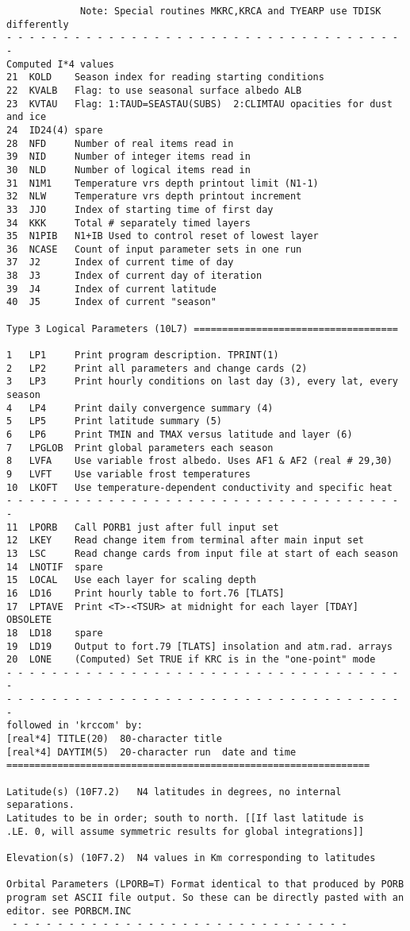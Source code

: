 \documentclass[draft]{article}  %
\begin{document}
\begin{verbatim}
             Note: Special routines MKRC,KRCA and TYEARP use TDISK differently
- - - - - - - - - - - - - - - - - - - - - - - - - - - - - - - - - - - - 
Computed I*4 values
21  KOLD    Season index for reading starting conditions
22  KVALB   Flag: to use seasonal surface albedo ALB
23  KVTAU   Flag: 1:TAUD=SEASTAU(SUBS)  2:CLIMTAU opacities for dust and ice
24  ID24(4) spare
28  NFD     Number of real items read in
39  NID     Number of integer items read in
30  NLD     Number of logical items read in
31  N1M1    Temperature vrs depth printout limit (N1-1)
32  NLW     Temperature vrs depth printout increment
33  JJO     Index of starting time of first day
34  KKK     Total # separately timed layers
35  N1PIB   N1+IB Used to control reset of lowest layer
36  NCASE   Count of input parameter sets in one run
37  J2      Index of current time of day
38  J3      Index of current day of iteration
39  J4      Index of current latitude
40  J5      Index of current "season"

Type 3 Logical Parameters (10L7) ====================================

1   LP1     Print program description. TPRINT(1) 
2   LP2     Print all parameters and change cards (2)
3   LP3     Print hourly conditions on last day (3), every lat, every season
4   LP4     Print daily convergence summary (4)
5   LP5     Print latitude summary (5)
6   LP6     Print TMIN and TMAX versus latitude and layer (6)
7   LPGLOB  Print global parameters each season
8   LVFA    Use variable frost albedo. Uses AF1 & AF2 (real # 29,30)
9   LVFT    Use variable frost temperatures
10  LKOFT   Use temperature-dependent conductivity and specific heat
- - - - - - - - - - - - - - - - - - - - - - - - - - - - - - - - - - - - 
11  LPORB   Call PORB1 just after full input set
12  LKEY    Read change item from terminal after main input set
13  LSC     Read change cards from input file at start of each season
14  LNOTIF  spare
15  LOCAL   Use each layer for scaling depth
16  LD16    Print hourly table to fort.76 [TLATS] 
17  LPTAVE  Print <T>-<TSUR> at midnight for each layer [TDAY] OBSOLETE
18  LD18    spare
19  LD19    Output to fort.79 [TLATS] insolation and atm.rad. arrays 
20  LONE    (Computed) Set TRUE if KRC is in the "one-point" mode
- - - - - - - - - - - - - - - - - - - - - - - - - - - - - - - - - - - - 
- - - - - - - - - - - - - - - - - - - - - - - - - - - - - - - - - - - - 
followed in 'krccom' by: 
[real*4] TITLE(20)	80-character title
[real*4] DAYTIM(5)	20-character run  date and time
================================================================

Latitude(s) (10F7.2)   N4 latitudes in degrees, no internal separations.
Latitudes to be in order; south to north. [[If last latitude is
.LE. 0, will assume symmetric results for global integrations]]

Elevation(s) (10F7.2)  N4 values in Km corresponding to latitudes

Orbital Parameters (LPORB=T) Format identical to that produced by PORB
program set ASCII file output. So these can be directly pasted with an
editor. see PORBCM.INC
 - - - - - - - - - - - - - - - - - - - - - - - - - - - - - - 
\end{verbatim}
\end{document}
